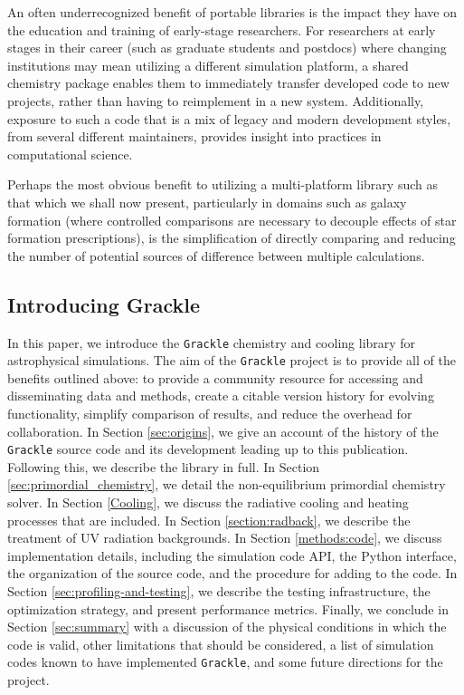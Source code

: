 An often underrecognized benefit of portable libraries
is the impact they have on the education and training of early-stage researchers.
For researchers at early stages in their career (such as graduate students and
postdocs) where changing institutions may mean utilizing a different simulation
platform, a shared chemistry package enables them to immediately transfer
developed code to new projects, rather than having to reimplement in a new
system.  Additionally, exposure to such a code that is a mix
of legacy and modern development styles, from several different maintainers,
provides insight into practices in computational science.

Perhaps the most obvious benefit to utilizing a multi-platform library such as
that which we shall now present, particularly in domains such as galaxy formation (where
controlled comparisons are necessary to decouple effects of star formation
prescriptions), is the simplification of directly comparing and reducing the
number of potential sources of difference between multiple calculations.

\subsection{Introducing Grackle}

In this paper, we introduce the \texttt{Grackle} chemistry and cooling
library for astrophysical simulations.  The aim of the
\texttt{Grackle} project is to provide all of the benefits outlined
above: to provide a community resource for accessing and disseminating
data and methods, create a citable version history for evolving
functionality, simplify comparison of results, and reduce the overhead
for collaboration.  In Section \ref{sec:origins}, we give an account
of the history of the \texttt{Grackle} source code and its development
leading up to this publication.  Following this, we describe the
library in full.  In Section \ref{sec:primordial_chemistry}, we detail
the non-equilibrium primordial chemistry solver.  In Section
\ref{Cooling}, we discuss the radiative cooling and heating processes
that are included.  In Section \ref{section:radback}, we describe
the treatment of UV radiation backgrounds.  In Section
\ref{methods:code}, we discuss implementation details, including the
simulation code API, the Python interface, the organization of
the source code, and the procedure for adding to the code.  In Section
\ref{sec:profiling-and-testing}, we describe the testing
infrastructure, the optimization strategy, and present performance
metrics.  Finally, we conclude in Section \ref{sec:summary} with a
discussion of the physical conditions in which the code is valid,
other limitations that should be considered, a list of simulation
codes known to have implemented \texttt{Grackle}, and some future
directions for the project.

